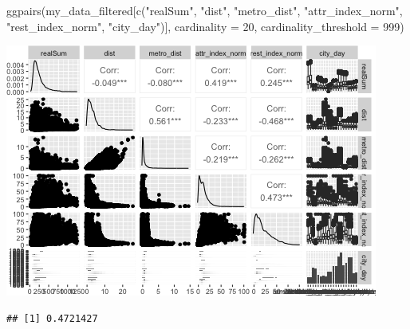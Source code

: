 \documentclass[
]{article}
\newenvironment{Shaded}{\begin{snugshade}}{\end{snugshade}}
\newcommand{\AttributeTok}[1]{\textcolor[rgb]{0.77,0.63,0.00}{#1}}
\newcommand{\DecValTok}[1]{\textcolor[rgb]{0.00,0.00,0.81}{#1}}
\newcommand{\FunctionTok}[1]{\textcolor[rgb]{0.00,0.00,0.00}{#1}}
\newcommand{\NormalTok}[1]{#1}
\newcommand{\SpecialCharTok}[1]{\textcolor[rgb]{0.00,0.00,0.00}{#1}}
\newcommand{\StringTok}[1]{\textcolor[rgb]{0.31,0.60,0.02}{#1}}
\begin{document}
\begin{Shaded}
\begin{Highlighting}[]
\FunctionTok{ggpairs}\NormalTok{(my\_data\_filtered[}\FunctionTok{c}\NormalTok{(}\StringTok{"realSum"}\NormalTok{, }\StringTok{"dist"}\NormalTok{, }\StringTok{"metro\_dist"}\NormalTok{, }\StringTok{"attr\_index\_norm"}\NormalTok{,}
    \StringTok{"rest\_index\_norm"}\NormalTok{, }\StringTok{"city\_day"}\NormalTok{)], }\AttributeTok{cardinality =} \DecValTok{20}\NormalTok{, }\AttributeTok{cardinality\_threshold =} \DecValTok{999}\NormalTok{)}
\end{Highlighting}
\end{Shaded}

\includegraphics{Project_files/figure-latex/unnamed-chunk-32-1.png}

\begin{Shaded}
\end{Shaded}

\begin{verbatim}
## [1] 0.4721427
\end{verbatim}
\end{document}
